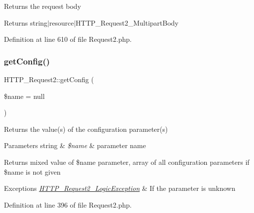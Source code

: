 Returns the request body

\begin{DoxyReturn}{Returns}
string$\vert$resource$\vert$\+H\+T\+T\+P\+\_\+\+Request2\+\_\+\+Multipart\+Body 
\end{DoxyReturn}


Definition at line 610 of file Request2.\+php.

\hypertarget{classHTTP__Request2_a420485bbf5cc4a95399fe01138fe6ce6}{}\label{classHTTP__Request2_a420485bbf5cc4a95399fe01138fe6ce6} 
\subsubsection{\texorpdfstring{get\+Config()}{getConfig()}}
{\footnotesize\ttfamily H\+T\+T\+P\+\_\+\+Request2\+::get\+Config (\begin{DoxyParamCaption}\item[{}]{\$name = {\ttfamily null} }\end{DoxyParamCaption})}

Returns the value(s) of the configuration parameter(s)


\begin{DoxyParams}[1]{Parameters}
string & {\em \$name} & parameter name\\
\hline
\end{DoxyParams}
\begin{DoxyReturn}{Returns}
mixed value of \$name parameter, array of all configuration parameters if \$name is not given 
\end{DoxyReturn}

\begin{DoxyExceptions}{Exceptions}
{\em \hyperlink{classHTTP__Request2__LogicException}{H\+T\+T\+P\+\_\+\+Request2\+\_\+\+Logic\+Exception}} & If the parameter is unknown \\
\hline
\end{DoxyExceptions}


Definition at line 396 of file Request2.\+php.

\hypertarget{classHTTP__Request2_ad56d5f45235cb4f753d1ee9c7cd4c0e0}{}\label{classHTTP__Request2_ad56d5f45235cb4f753d1ee9c7cd4c0e0} 

